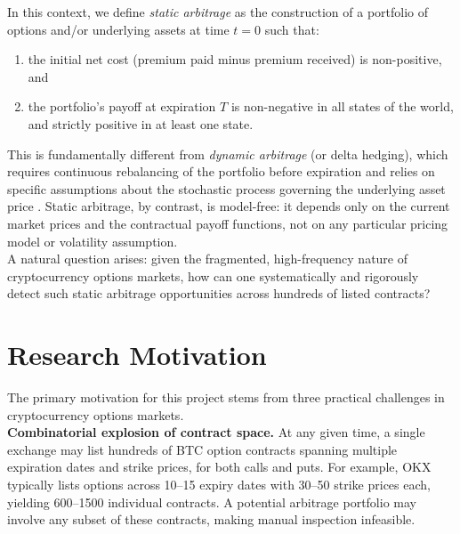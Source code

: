 \documentclass[openany]{book}
\numberwithin{figure}{chapter}
\numberwithin{equation}{chapter}
\begin{document}
In this context, we define \textit{static arbitrage} as the construction of a portfolio of options and/or underlying assets at time $t = 0$ such that:
\begin{enumerate}
    \item the initial net cost (premium paid minus premium received) is non-positive, and
    \item the portfolio's payoff at expiration $T$ is non-negative in all states of the world, and strictly positive in at least one state.
\end{enumerate}
This is fundamentally different from \textit{dynamic arbitrage} (or delta hedging), which requires continuous rebalancing of the portfolio before expiration and relies on specific assumptions about the stochastic process governing the underlying asset price \cite{merton1973, black1973}. Static arbitrage, by contrast, is model-free: it depends only on the current market prices and the contractual payoff functions, not on any particular pricing model or volatility assumption.\\

A natural question arises: given the fragmented, high-frequency nature of cryptocurrency options markets, how can one systematically and rigorously detect such static arbitrage opportunities across hundreds of listed contracts?

\section{Research Motivation}

The primary motivation for this project stems from three practical challenges in cryptocurrency options markets.\\

\textbf{Combinatorial explosion of contract space.} At any given time, a single exchange may list hundreds of BTC option contracts spanning multiple expiration dates and strike prices, for both calls and puts. For example, OKX typically lists options across 10--15 expiry dates with 30--50 strike prices each, yielding 600--1500 individual contracts. A potential arbitrage portfolio may involve any subset of these contracts, making manual inspection infeasible.\\
\end{document}
